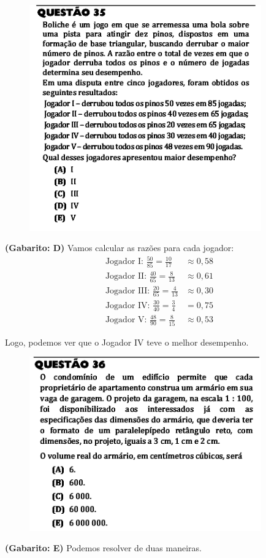 \documentclass[a4paper]{article}
\begin{document}
\begin{figure}[H]
	\begin{center}
		\includegraphics[width=10cm]{L2Q35.png}
	\end{center}
\end{figure}
\par\textbf{(Gabarito: D)} Vamos calcular as razões para cada jogador:
\begin{align*}
\text{Jogador I: }\frac{50}{85} = \frac{10}{17} &\approx 0,58 \\
\text{Jogador II: }\frac{40}{65} = \frac{8}{13} &\approx 0,61 \\
\text{Jogador III: }\frac{20}{65} = \frac{4}{13} &\approx 0,30 \\
\text{Jogador IV: }\frac{30}{40} = \frac{3}{4} &= 0,75\\
\text{Jogador V: }\frac{48}{90} = \frac{8}{15} &\approx 0,53 
\end{align*}
\par\vspace{0.3cm} Logo, podemos ver que o Jogador IV teve o melhor desempenho.
\begin{figure}[H]
	\begin{center}
		\includegraphics[width=10cm]{L2Q36.png}
	\end{center}
\end{figure}
\par\textbf{(Gabarito: E)} Podemos resolver de duas maneiras.
\end{document}
